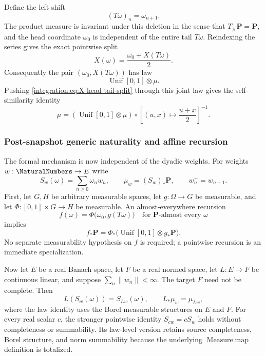 \documentclass[11pt,oneside]{article}
\theoremstyle{definition}
\theoremstyle{remark}
\begin{document}
Define the left shift
\begin{equation}
 (T\omega)_n=\omega_{n+1}.
 \label{integration:eq:tail-map}
\end{equation}
The product measure is invariant under this deletion in the sense that $T_\#\mathbf P=\mathbf
P$, and the head coordinate $\omega_0$ is independent of the entire tail $T\omega$.  Reindexing
the series gives the exact pointwise split
\begin{equation}
 X(\omega)=\frac{\omega_0+X(T\omega)}2.
 \label{integration:eq:X-head-tail-split}
\end{equation}
Consequently the pair $(\omega_0,X(T\omega))$ has law
\begin{equation}
 \operatorname{Unif}[0,1]\otimes\mu.
 \label{integration:eq:head-tail-law}
\end{equation}
Pushing \eqref{integration:eq:X-head-tail-split} through this joint law gives the self-similarity identity
\begin{equation}
 \mu=\left(\operatorname{Unif}[0,1]\otimes\mu\right)
       \circ\left[(u,x)\mapsto\frac{u+x}{2}\right]^{-1}.
 \label{integration:eq:law-self-similarity}
\end{equation}

\subsubsection{Post-snapshot generic naturality and affine recursion}
\label{integration:sec:weighted-naturality}

The formal mechanism is now independent of the dyadic weights.  For weights \(w:\NaturalNumbers\to E\)
write
\[
 S_w(\omega)=\sum_{n\ge0}\omega_nw_n,
 \qquad
 \mu_w=(S_w)_*\mathbf P,
 \qquad
 w_n^+=w_{n+1}.
\]
First, let \(G,H\) be arbitrary measurable spaces, let \(g:\Omega\to G\) be measurable,
and let \(\Phi:[0,1]\times G\to H\) be measurable.  An almost-everywhere recursion
\[
 f(\omega)=\Phi\bigl(\omega_0,g(T\omega)\bigr)
 \quad\text{for \(\mathbf P\)-almost every \(\omega\)}
\]
implies
\begin{equation}
 f_*\mathbf P
 =\Phi_*\bigl(\operatorname{Unif}[0,1]\otimes g_*\mathbf P\bigr).
 \label{integration:eq:generic-ae-recursion}
\end{equation}
No separate measurability hypothesis on \(f\) is required; a pointwise recursion is an
immediate specialization.

Now let \(E\) be a real Banach space, let \(F\) be a real normed space, let
\(L:E\to F\) be continuous linear, and suppose \(\sum_n\lVert w_n\rVert<\infty\).
The target \(F\) need not be complete.  Then
\begin{equation}
 L(S_w(\omega))=S_{Lw}(\omega),\qquad L_*\mu_w=\mu_{Lw},
 \label{integration:eq:weighted-naturality}
\end{equation}
where the law identity uses the Borel measurable structures on \(E\) and \(F\).
For every real scalar \(c\), the stronger pointwise identity
\(S_{cw}=cS_w\) holds without completeness or summability.  Its law-level version retains
source completeness, Borel structure, and norm summability because the underlying
\(\operatorname{Measure.map}\) definition is totalized.
\end{document}
